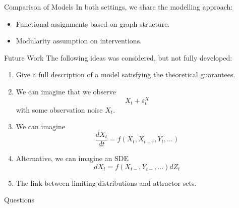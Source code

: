 \documentclass[10pt]{beamer}
\begin{document}
\begin{frame}{Comparison of Models}
In both settings, we share the modelling approach:
\begin{itemize}
	\item<2-> Functional assignments based on graph structure.
	\item<3-> Modularity assumption on interventions.
\end{itemize}
\end{frame}


\begin{frame}{Future Work}
The following ideas was considered, but not fully developed:
\begin{enumerate}
	\item<2-> Give a full description of a model satisfying the theoretical guarantees.
	\item<3-> We can imagine that we observe 
	$$X_t+\varepsilon_t^X$$
	with some observation noise $X_t$. 
	\item<4-> We can imagine 
	$$\frac{dX_t}{dt}=f(X_t,X_{t-\tau},Y_t,\ldots)$$
	\item<5-> Alternative, we can imagine an SDE
	$$dX_t=f(X_{t-},Y_{t-},\ldots) dZ_t$$
	\item<6-> The link between limiting distributions and attractor sets.
\end{enumerate}
\end{frame}



\begin{frame}{Questions}

\end{frame}
\end{document}
